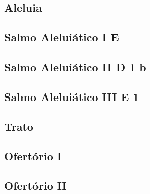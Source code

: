 \subsection{Aleluia}\label{subsection:liturgia-defunctorum/missa-pro-defunctis/alleluia}

\subsection[Salmo Aleluiático I]{Salmo Aleluiático I \textmd{E \protect\GreStar}}\label{subsection:liturgia-defunctorum/missa-pro-defunctis/psalmus-alleluiaticus-1}

\AllowPageFlush

\subsection[Salmo Aleluiático II]{Salmo Aleluiático II \textmd{D 1 b}}\label{subsection:liturgia-defunctorum/missa-pro-defunctis/psalmus-alleluiaticus-2}

\AllowPageFlush

\subsection[Salmo Aleluiático III]{Salmo Aleluiático III \textmd{E 1}}\label{subsection:liturgia-defunctorum/missa-pro-defunctis/psalmus-alleluiaticus-3}

\subsection{Trato}\label{subsection:liturgia-defunctorum/missa-pro-defunctis/tractus}

\subsection{Ofertório I}\label{subsection:liturgia-defunctorum/missa-pro-defunctis/offertorium-1}

\subsection{Ofertório II}\label{subsection:liturgia-defunctorum/missa-pro-defunctis/offertorium-2}

